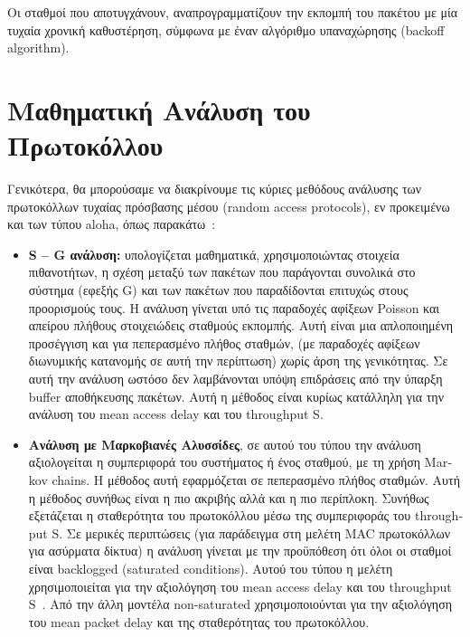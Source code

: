 \documentclass[12pt]{report}
\begin{document}
Οι σταθμοί που αποτυγχάνουν, αναπρογραμματίζουν την εκπομπή του πακέτου με μία τυχαία χρονική καθυστέρηση, σύμφωνα με έναν αλγόριθμο υπαναχώρησης (\textlatin{backoff algorithm}).

\section{Μαθηματική Ανάλυση του Πρωτοκόλλου}
Γενικότερα, θα μπορούσαμε να διακρίνουμε τις κύριες μεθόδους ανάλυσης των πρωτοκόλλων τυχαίας πρόσβασης μέσου (\textlatin{random access protocols}), εν προκειμένω και των τύπου \textlatin{aloha}, όπως παρακάτω~\cite{book:01}:

\begin{itemize}
  \item \textbf{\textlatin{S – G} ανάλυση:} υπολογίζεται μαθηματικά, χρησιμοποιώντας στοιχεία πιθανοτήτων, η σχέση μεταξύ των πακέτων που παράγονται συνολικά στο σύστημα (εφεξής \textlatin{G}) και των πακέτων που παραδίδονται επιτυχώς στους προορισμούς τους. Η ανάλυση γίνεται υπό τις παραδοχές αφίξεων \textlatin{Poisson} και απείρου πλήθους στοιχειώδεις σταθμούς εκπομπής. Αυτή είναι μια απλοποιημένη προσέγγιση και για πεπερασμένο πλήθος σταθμών, (με παραδοχές αφίξεων διωνυμικής κατανομής σε αυτή την περίπτωση) χωρίς άρση της γενικότητας. Σε αυτή την ανάλυση ωστόσο δεν λαμβάνονται υπόψη επιδράσεις από την ύπαρξη \textlatin{buffer} αποθήκευσης πακέτων. Αυτή η μέθοδος είναι κυρίως κατάλληλη για την ανάλυση του \textlatin{mean access delay} και του \textlatin{throughput S}.

  \item \textbf{Ανάλυση με Μαρκοβιανές Αλυσσίδες}, σε αυτού του τύπου την ανάλυση αξιολογείται η συμπεριφορά του συστήματος ή ένος σταθμού, με τη χρήση \textlatin{Markov chains}. Η μέθοδος αυτή εφαρμόζεται σε πεπερασμένο πλήθος σταθμών. Αυτή η μέθοδος συνήθως είναι η πιο ακριβής αλλά και η πιο περίπλοκη. Συνήθως εξετάζεται η σταθερότητα του πρωτοκόλλου μέσω της συμπεριφοράς του \textlatin{throughput S}. Σε μερικές περιπτώσεις (για παράδειγμα στη μελέτη \textlatin{MAC} πρωτοκόλλων για ασύρματα δίκτυα) η ανάλυση γίνεται με την προϋπόθεση ότι όλοι οι σταθμοί είναι \textlatin{backlogged (saturated conditions)}. Αυτού του τύπου η μελέτη χρησιμοποιείται για την αξιολόγηση του \textlatin{mean access delay} και του \textlatin{throughput S}~\cite{paper:01}. Από την άλλη μοντέλα \textlatin{non-saturated} χρησιμοποιούνται για την αξιολόγηση του \textlatin{mean packet delay} και της σταθερότητας του πρωτοκόλλου.


\end{itemize}
\end{document}
